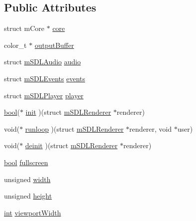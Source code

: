 \subsection*{Public Attributes}
\begin{DoxyCompactItemize}
\item 
struct m\+Core $\ast$ \mbox{\hyperlink{structm_s_d_l_renderer_a82675cacb399f5b6242ded1505c22389}{core}}
\item 
color\+\_\+t $\ast$ \mbox{\hyperlink{structm_s_d_l_renderer_a397ea1ee032811d4465a0c6742bc96fc}{output\+Buffer}}
\item 
struct \mbox{\hyperlink{sdl-audio_8h_structm_s_d_l_audio}{m\+S\+D\+L\+Audio}} \mbox{\hyperlink{structm_s_d_l_renderer_a56bc00b697ae65b931a6fd3765e79e1a}{audio}}
\item 
struct \mbox{\hyperlink{sdl-events_8h_structm_s_d_l_events}{m\+S\+D\+L\+Events}} \mbox{\hyperlink{structm_s_d_l_renderer_a39a9a46368b3a8546cd93c3095ee1f9c}{events}}
\item 
struct \mbox{\hyperlink{sdl-events_8h_structm_s_d_l_player}{m\+S\+D\+L\+Player}} \mbox{\hyperlink{structm_s_d_l_renderer_ab7d4188d43751fd8b0a59fe2c9752d91}{player}}
\item 
\mbox{\hyperlink{libretro_8h_a4a26dcae73fb7e1528214a068aca317e}{bool}}($\ast$ \mbox{\hyperlink{structm_s_d_l_renderer_a0fc1e58dc1eb45a57b4c258a86e9fd20}{init}} )(struct \mbox{\hyperlink{structm_s_d_l_renderer}{m\+S\+D\+L\+Renderer}} $\ast$renderer)
\item 
void($\ast$ \mbox{\hyperlink{structm_s_d_l_renderer_ada05b2b9f962dc2355a0f0be6feb0bd3}{runloop}} )(struct \mbox{\hyperlink{structm_s_d_l_renderer}{m\+S\+D\+L\+Renderer}} $\ast$renderer, void $\ast$user)
\item 
void($\ast$ \mbox{\hyperlink{structm_s_d_l_renderer_aa8bf6b632d75051c599b78dfadeb97bb}{deinit}} )(struct \mbox{\hyperlink{structm_s_d_l_renderer}{m\+S\+D\+L\+Renderer}} $\ast$renderer)
\item 
\mbox{\hyperlink{libretro_8h_a4a26dcae73fb7e1528214a068aca317e}{bool}} \mbox{\hyperlink{structm_s_d_l_renderer_a25ee253ee6975cbae0c7ee9ec3a1bbdb}{fullscreen}}
\item 
unsigned \mbox{\hyperlink{structm_s_d_l_renderer_a768f7abe0f1134a8896dce5e86cb8241}{width}}
\item 
unsigned \mbox{\hyperlink{structm_s_d_l_renderer_a8a7a1efa1680a228cafad1e26ce29868}{height}}
\item 
\mbox{\hyperlink{ioapi_8h_a787fa3cf048117ba7123753c1e74fcd6}{int}} \mbox{\hyperlink{structm_s_d_l_renderer_a0a2d83dd890f12b471db8b60dc40da59}{viewport\+Width}}

\end{DoxyCompactItemize}
